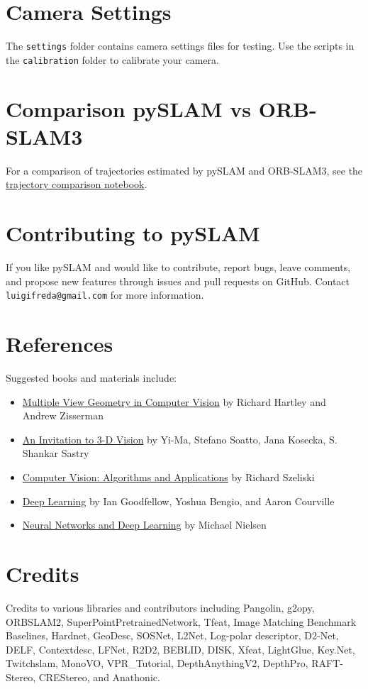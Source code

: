 \documentclass{article}
\begin{document}
\section{Camera Settings}
The \texttt{settings} folder contains camera settings files for testing. Use the scripts in the \texttt{calibration} folder to calibrate your camera.

\section{Comparison pySLAM vs ORB-SLAM3}
For a comparison of trajectories estimated by pySLAM and ORB-SLAM3, see the \href{https://github.com/anathonic/Trajectory-Comparison-ORB-SLAM3-pySLAM/blob/main/trajectories_comparison.ipynb}{trajectory comparison notebook}.

\section{Contributing to pySLAM}
If you like pySLAM and would like to contribute, report bugs, leave comments, and propose new features through issues and pull requests on GitHub. Contact \texttt{luigifreda@gmail.com} for more information.

\section{References}
Suggested books and materials include:
\begin{itemize}
    \item \href{https://www.robots.ox.ac.uk/~vgg/hzbook/}{Multiple View Geometry in Computer Vision} by Richard Hartley and Andrew Zisserman
    \item \href{https://link.springer.com/book/10.1007/978-0-387-21779-6}{An Invitation to 3-D Vision} by Yi-Ma, Stefano Soatto, Jana Kosecka, S. Shankar Sastry
    \item \href{http://szeliski.org/Book/}{Computer Vision: Algorithms and Applications} by Richard Szeliski
    \item \href{http://www.deeplearningbook.org/lecture_slides.html}{Deep Learning} by Ian Goodfellow, Yoshua Bengio, and Aaron Courville
    \item \href{http://neuralnetworksanddeeplearning.com/index.html}{Neural Networks and Deep Learning} by Michael Nielsen
\end{itemize}

\section{Credits}
Credits to various libraries and contributors including Pangolin, g2opy, ORBSLAM2, SuperPointPretrainedNetwork, Tfeat, Image Matching Benchmark Baselines, Hardnet, GeoDesc, SOSNet, L2Net, Log-polar descriptor, D2-Net, DELF, Contextdesc, LFNet, R2D2, BEBLID, DISK, Xfeat, LightGlue, Key.Net, Twitchslam, MonoVO, VPR\_Tutorial, DepthAnythingV2, DepthPro, RAFT-Stereo, CREStereo, and Anathonic.
\end{document}
